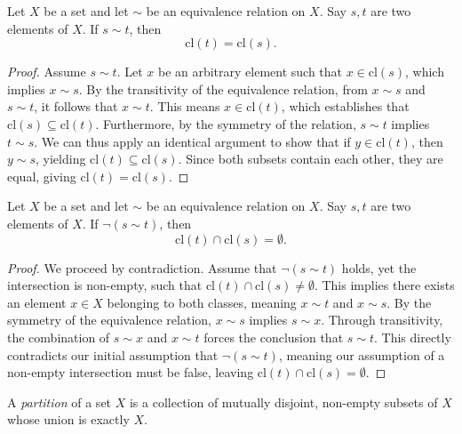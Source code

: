 \documentclass[../ium.tex]{subfiles}
\begin{document}
\begin{lemma}
\begin{shaded*}
Let $X$ be a set and let $\sim$ be an equivalence relation on $X$. Say $s, t$ are two elements of $X$. If $s \sim t$, then
\[
\mathrm{cl}(t) = \mathrm{cl}(s).
\]
\end{shaded*}
\end{lemma}
\begin{proof}
Assume $s \sim t$. Let $x$ be an arbitrary element such that $x \in \mathrm{cl}(s)$, which implies $x \sim s$. By the transitivity of the equivalence relation, from $x \sim s$ and $s \sim t$, it follows that $x \sim t$. This means $x \in \mathrm{cl}(t)$, which establishes that $\mathrm{cl}(s) \subseteq \mathrm{cl}(t)$. Furthermore, by the symmetry of the relation, $s \sim t$ implies $t \sim s$. We can thus apply an identical argument to show that if $y \in \mathrm{cl}(t)$, then $y \sim s$, yielding $\mathrm{cl}(t) \subseteq \mathrm{cl}(s)$. Since both subsets contain each other, they are equal, giving $\mathrm{cl}(t) = \mathrm{cl}(s)$.
\end{proof}

\begin{lemma}
\begin{shaded*}
Let $X$ be a set and let $\sim$ be an equivalence relation on $X$. Say $s, t$ are two elements of $X$. If $\neg (s \sim t)$, then
\[
\mathrm{cl}(t) \cap \mathrm{cl}(s) = \emptyset.
\]
\end{shaded*}
\end{lemma}
\begin{proof}
We proceed by contradiction. Assume that $\neg(s \sim t)$ holds, yet the intersection is non-empty, such that $\mathrm{cl}(t) \cap \mathrm{cl}(s) \ne \emptyset$. This implies there exists an element $x \in X$ belonging to both classes, meaning $x \sim t$ and $x \sim s$. By the symmetry of the equivalence relation, $x \sim s$ implies $s \sim x$. Through transitivity, the combination of $s \sim x$ and $x \sim t$ forces the conclusion that $s \sim t$. This directly contradicts our initial assumption that $\neg(s \sim t)$, meaning our assumption of a non-empty intersection must be false, leaving $\mathrm{cl}(t) \cap \mathrm{cl}(s) = \emptyset$.
\end{proof}

\begin{definition}
\begin{shaded*}
A \textit{partition} of a set $X$ is a collection of mutually disjoint, non-empty subsets of $X$ whose union is exactly $X$.
\end{shaded*}
\end{definition}
\end{document}
